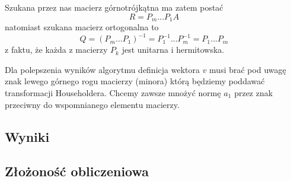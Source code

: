 Szukana przez nas macierz górnotrójkątna ma zatem postać
$$R=P_m...P_1A$$
natomiast szukana macierz ortogonalna to
$$Q=(P_m...P_1)^{-1}=P_1^{-1}...P_m^{-1}=P_1...P_m$$
z faktu, że każda z macierzy $P_k$ jest unitarna i hermitowska.

Dla polepszenia wyników algorytmu definicja wektora $v$ musi brać pod uwagę znak lewego górnego rogu macierzy (minora) którą będziemy poddawać transformacji Householdera. Chcemy zawsze mnożyć normę $a_1$ przez znak przeciwny do wspomnianego elementu macierzy.

\subsection{Wyniki}

\subsection{Złożoność obliczeniowa}

